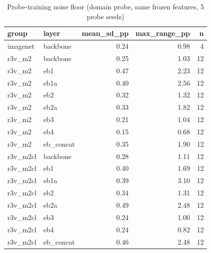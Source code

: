 \begin{table}
\caption{Probe-training noise floor (domain probe, same frozen features, 5 probe seeds)}
\label{tab:leak_noise_floor}
\begin{tabular}{llrrr}
\toprule
group & layer & mean\_sd\_pp & max\_range\_pp & n \\
\midrule
imagenet & backbone & 0.24 & 0.98 & 4 \\
r3v\_m2 & backbone & 0.25 & 1.03 & 12 \\
r3v\_m2 & eb1 & 0.47 & 2.23 & 12 \\
r3v\_m2 & eb1a & 0.40 & 2.56 & 12 \\
r3v\_m2 & eb2 & 0.32 & 1.32 & 12 \\
r3v\_m2 & eb2a & 0.33 & 1.82 & 12 \\
r3v\_m2 & eb3 & 0.21 & 1.04 & 12 \\
r3v\_m2 & eb4 & 0.15 & 0.68 & 12 \\
r3v\_m2 & eb\_concat & 0.35 & 1.90 & 12 \\
r3v\_m2cl & backbone & 0.28 & 1.11 & 12 \\
r3v\_m2cl & eb1 & 0.40 & 1.69 & 12 \\
r3v\_m2cl & eb1a & 0.39 & 3.10 & 12 \\
r3v\_m2cl & eb2 & 0.34 & 1.31 & 12 \\
r3v\_m2cl & eb2a & 0.49 & 2.48 & 12 \\
r3v\_m2cl & eb3 & 0.24 & 1.00 & 12 \\
r3v\_m2cl & eb4 & 0.24 & 0.82 & 12 \\
r3v\_m2cl & eb\_concat & 0.46 & 2.48 & 12 \\
\bottomrule
\end{tabular}
\end{table}
